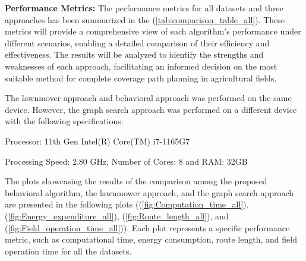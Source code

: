 \vspace*{6mm}   

\textbf{Performance Metrics: } The performance metrics for all datasets and three approaches has been summarized in the (\autoref{tab:comparison_table_all}). These metrics will provide a comprehensive view of each algorithm's performance under different scenarios, enabling a detailed comparison of their efficiency and effectiveness. The results will be analyzed to identify the strengths and weaknesses of each approach, facilitating an informed decision on the most suitable method for complete coverage path planning in agricultural fields.




\vspace*{6mm}

The lawnmover approach and behavioral approach was performed on the same device. However, the graph search approach was performed on a different device with the following specifications:


Processor: 11th Gen Intel(R) Core(TM) i7-1165G7


Processing Speed: 2.80 GHz, Number of Cores: 8 and RAM: 32GB


\vspace*{6mm}


The plots showcasing the results of the comparison among the proposed behavioral algorithm, the lawnmower approach, and the graph search approach are presented in the following plots ((\autoref{fig:Computation_time_all}), (\autoref{fig:Energy_expenditure_all}), (\autoref{fig:Route_length_all}), and (\autoref{fig:Field_operation_time_all})). Each plot represents a specific performance metric, such as computational time, energy consumption, route length, and field operation time for all the datasets. 




